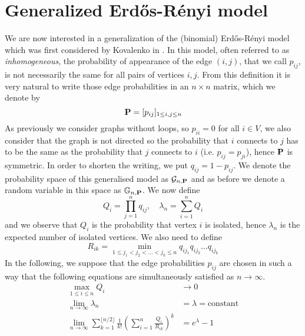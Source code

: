 \section{Generalized Erd\H{o}s-R\'enyi model}
We are now interested in a generalization of the (binomial) Erd\H{o}s-R\'enyi model which was first considered by Kovalenko in \cite{Kovalenko71}.
In this model, often referred to as \emph{inhomogeneous}, the probability of appearance of the edge $(i,j)$, that we call $p_{ij}$, is not necessarily the same for all pairs of vertices $i,j$.
\newline
From this definition it is very natural to write those edge probabilities in an $n\times n$ matrix, which we denote by
\begin{equation}
	\bold{P} = [p_{ij}]_{1\leq i,j \leq n}
\end{equation}
As previously we consider graphs without loops, so $p_{ii} = 0$ for all $i \in V$, we also consider that the graph is not directed so the probability that $i$ connects to $j$ has to be the same as the probability that $j$ connects to $i$ (i.e. $p_{ij} = p_{ji}$), hence $\bold{P}$ is symmetric.
In order to shorten the writing, we put $q_{ij} = 1 - p_{ij}$.
\newline
We denote the probability space of this generalised model as $\mathcal{G}_{n,\bold{P}}$ and as before we denote a random variable in this space as $\mathbb{G}_{n,\bold{P}}$.
\newline
We now define
\begin{equation}
	Q_i = \prod_{j=1}^n q_{ij}, \quad \lambda_n = \sum_{i=1}^nQ_i
\end{equation}
and we observe that $Q_i$ is the probability that vertex $i$ is isolated, hence $\lambda_n$ is the expected number of isolated vertices.
\newline
We also need to define
\begin{equation}
	R_{ik} = \min_{1\leq j_1<j_2< \ldots <j_k\leq n} q_{ij_1}q_{ij_2}\ldots q_{ij_k}
\end{equation}
In the following, we suppose that the edge probabilities $p_{ij}$ are chosen in such a way that the following equations are simultaneously satisfied as $n\to \infty$.
\begin{align}
	\max_{1\leq i \leq n} Q_i &\to 0 \label{eq:C1}\\
	\lim_{n \to \infty} \lambda_n &= \lambda = \text{constant} \label{eq:C2} \\
	\lim_{n\to \infty} \sum_{k=1}^{\lfloor n/2 \rfloor} \frac{1}{k!}(\sum_{i=1}^n \frac{Q_i}{R_{ik}})^k &= e^{\lambda} - 1 \label{eq:C3}
\end{align}
